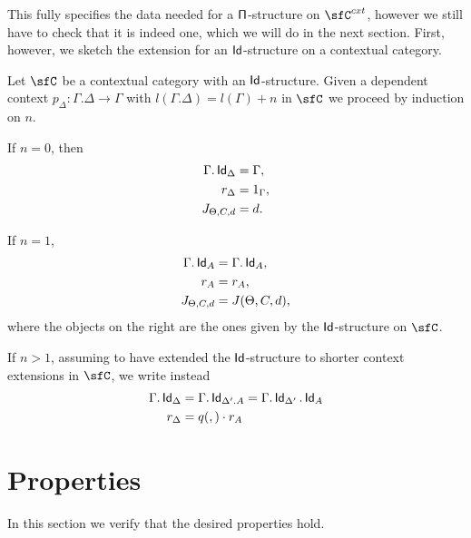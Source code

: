 This fully specifies the data needed for a $\operatorname{\mathsf{\Pi}}$-structure on $\sfC^{cxt}$,
however we still have to check that it is indeed one, which we will do in the
next section. First, however, we sketch the extension for an $\operatorname{\mathsf{Id}}$-structure on
a contextual category.

\begin{construction}
  Let $\sfC$ be a contextual category with an $\operatorname{\mathsf{Id}}$-structure. Given a dependent
  context $p_\Delta\colon\Gamma.\Delta\rightarrow\Gamma$ with
  $l(\Gamma.\Delta)=l(\Gamma)+n$ in $\sfC$ we proceed by induction on $n$.

  If $n=0$, then
  \begin{align*}
    \Gamma.\operatorname{\mathsf{Id}}_\Delta &=\Gamma, \\
    r_\Delta &=1_\Gamma, \\
    J_{\Theta,C,d} &=d.
  \end{align*}

  If $n=1$,
  \begin{align*}
    \Gamma.\operatorname{\mathsf{Id}}_A &=\Gamma.\operatorname{\mathsf{Id}}_A, \\
    r_A &=r_A, \\
    J_{\Theta,C,d} &=J(\Theta,C,d),
  \end{align*}
  where the objects on the right are the ones given by the $\operatorname{\mathsf{Id}}$-structure on
  $\sfC$.

  If $n>1$, assuming to have extended the $\operatorname{\mathsf{Id}}$-structure to shorter context
  extensions in $\sfC$, we write instead
  \begin{align*}
    \Gamma.\operatorname{\mathsf{Id}}_{\Delta} &=\Gamma.\operatorname{\mathsf{Id}}_{\Delta'.A}=\Gamma.\operatorname{\mathsf{Id}}_{\Delta'}.\operatorname{\mathsf{Id}}_A \\
    r_{\Delta} &= q(,)\cdot r_A
  \end{align*}
\end{construction}


\section{Properties}

In this section we verify that the desired properties hold.

